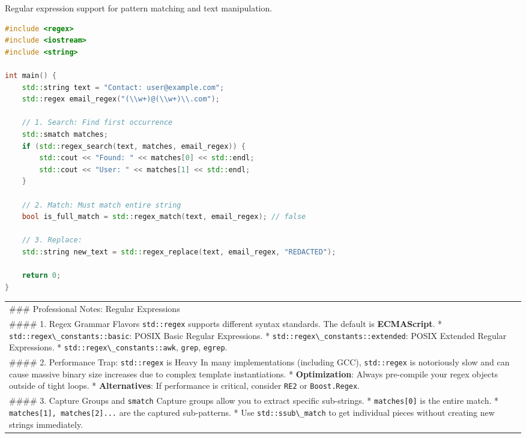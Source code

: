 Regular expression support for pattern matching and text manipulation.

\begin{lstlisting}[language={C++}]
#include <regex>
#include <iostream>
#include <string>

int main() {
    std::string text = "Contact: user@example.com";
    std::regex email_regex("(\\w+)@(\\w+)\\.com");

    // 1. Search: Find first occurrence
    std::smatch matches;
    if (std::regex_search(text, matches, email_regex)) {
        std::cout << "Found: " << matches[0] << std::endl;
        std::cout << "User: " << matches[1] << std::endl;
    }

    // 2. Match: Must match entire string
    bool is_full_match = std::regex_match(text, email_regex); // false

    // 3. Replace:
    std::string new_text = std::regex_replace(text, email_regex, "REDACTED");

    return 0;
}
\end{lstlisting}

\begin{longtable}[]{@{}
  >{\raggedright\arraybackslash}p{}@{}}
\toprule
\endhead
\#\#\# Professional Notes: Regular Expressions \\
\#\#\#\# 1. Regex Grammar Flavors \passthrough{\lstinline!std::regex!}
supports different syntax standards. The default is \textbf{ECMAScript}.
* \passthrough{\lstinline!std::regex\_constants::basic!}: POSIX Basic
Regular Expressions. *
\passthrough{\lstinline!std::regex\_constants::extended!}: POSIX
Extended Regular Expressions. *
\passthrough{\lstinline!std::regex\_constants::awk!},
\passthrough{\lstinline!grep!}, \passthrough{\lstinline!egrep!}. \\
\#\#\#\# 2. Performance Trap: \passthrough{\lstinline!std::regex!} is
Heavy In many implementations (including GCC),
\passthrough{\lstinline!std::regex!} is notoriously slow and can cause
massive binary size increases due to complex template instantiations. *
\textbf{Optimization}: Always pre-compile your regex objects outside of
tight loops. * \textbf{Alternatives}: If performance is critical,
consider \passthrough{\lstinline!RE2!} or
\passthrough{\lstinline!Boost.Regex!}. \\
\#\#\#\# 3. Capture Groups and \passthrough{\lstinline!smatch!} Capture
groups allow you to extract specific sub-strings. *
\passthrough{\lstinline!matches[0]!} is the entire match. *
\passthrough{\lstinline!matches[1], matches[2]...!} are the captured
sub-patterns. * Use \passthrough{\lstinline!std::ssub\_match!} to get
individual pieces without creating new strings immediately. \\
\bottomrule
\end{longtable}

